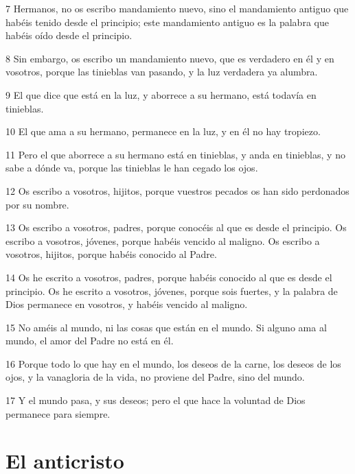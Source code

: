 \par 7 Hermanos, no os escribo mandamiento nuevo, sino el mandamiento antiguo que habéis tenido desde el principio; este mandamiento antiguo es la palabra que habéis oído desde el principio.
\par 8 Sin embargo, os escribo un mandamiento nuevo, que es verdadero en él y en vosotros, porque las tinieblas van pasando, y la luz verdadera ya alumbra.
\par 9 El que dice que está en la luz, y aborrece a su hermano, está todavía en tinieblas.
\par 10 El que ama a su hermano, permanece en la luz, y en él no hay tropiezo.
\par 11 Pero el que aborrece a su hermano está en tinieblas, y anda en tinieblas, y no sabe a dónde va, porque las tinieblas le han cegado los ojos.
\par 12 Os escribo a vosotros, hijitos, porque vuestros pecados os han sido perdonados por su nombre.
\par 13 Os escribo a vosotros, padres, porque conocéis al que es desde el principio. Os escribo a vosotros, jóvenes, porque habéis vencido al maligno. Os escribo a vosotros, hijitos, porque habéis conocido al Padre.
\par 14 Os he escrito a vosotros, padres, porque habéis conocido al que es desde el principio. Os he escrito a vosotros, jóvenes, porque sois fuertes, y la palabra de Dios permanece en vosotros, y habéis vencido al maligno.
\par 15 No améis al mundo, ni las cosas que están en el mundo. Si alguno ama al mundo, el amor del Padre no está en él.
\par 16 Porque todo lo que hay en el mundo, los deseos de la carne, los deseos de los ojos, y la vanagloria de la vida, no proviene del Padre, sino del mundo.
\par 17 Y el mundo pasa, y sus deseos; pero el que hace la voluntad de Dios permanece para siempre.

\section*{El anticristo}

